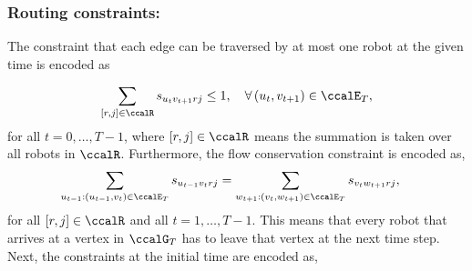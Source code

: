 \documentclass[Afour,sageh,times]{sagej}
\begin{document}
{{{\subsubsection{Routing constraints:}
The constraint that each edge can be traversed by at most one robot at the given time is encoded as}
\begingroup\makeatletter{}\check@mathfonts
\def\maketag@@@#1{\hbox{\m@th\normalsize\normalfont#1}}%
\begin{align}
  \sum_{[r,j] \in \ccalR} s_{u_t v_{t+1}rj} \leq 1, \quad \forall \,(u_t,v_{t+1}) \in \ccalE_T,
\end{align}
\endgroup
for all $t=0,\ldots, T-1$, where $[r,j]\in\ccalR$ means the summation is taken over all robots in $\ccalR$. Furthermore, the flow conservation constraint is encoded as,
\begingroup\makeatletter\def\f@size{10}\check@mathfonts
\def\maketag@@@#1{\hbox{\m@th\normalsize\normalfont#1}}%
\begingroup
  \begin{align}\label{equ:flow}
  \sum_{u_{t-1}:(u_{t-1}, v_t) \in \ccalE_T}   s_{u_{t-1} v_t rj} &  =   \sum_{w_{t+1}:(v_t, w_{t+1}) \in \ccalE_T} s_{v_t w_{t+1} rj},
  \end{align}
\endgroup
for all $[r,j]\in \ccalR$ and all $t=1,\ldots,T-1$. This means that every robot that arrives at a vertex in $\ccalG_T$ has to leave that vertex at the next time step. Next, the constraints at the initial time are encoded as,
\begingroup\makeatletter\def\f@size{10}\check@mathfonts
\def\maketag@@@#1{\hbox{\m@th\normalsize\normalfont#1}}%
\begingroup

}}
\end{document}
